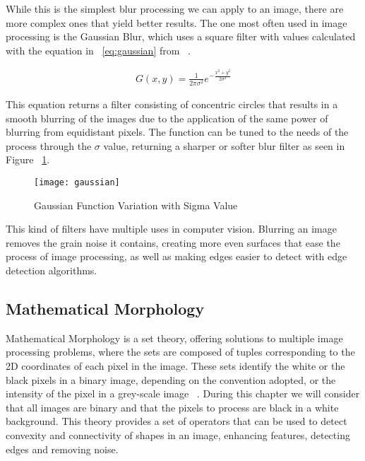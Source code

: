 While this is the simplest blur processing we can apply to an image, there are more complex ones that yield better results. The one most often used in image processing is the Gaussian Blur, which uses a square filter with values calculated with the equation in ~\ref{eq:gaussian} from ~\cite{shapiro_computer_2001}.

\begin{eqnarray}
\label{eq:gaussian}
G(x,y) = \frac{1}{2\pi \sigma ^{2}}e^{-\frac{x^{2}+y^{2}}{2\sigma ^{2}}}
\end{eqnarray}

This equation returns a filter consisting of concentric circles that results in a smooth blurring of the images due to the application of the same power of blurring from equidistant pixels. The function can be tuned to the needs of the process through the $\sigma$ value, returning a sharper or softer blur filter as seen in Figure ~\ref{fig:gaussian}.

\begin{figure}[h]
  \begin{center}
    \leavevmode
    \texttt{[image: gaussian]}
    \caption{Gaussian Function Variation with Sigma Value}
    \label{fig:gaussian}
  \end{center}
\end{figure}

This kind of filters have multiple uses in computer vision. Blurring an image removes the grain noise it contains, creating more even surfaces that ease the process of image processing, as well as making edges easier to detect with edge detection algorithms.

\subsection{Mathematical Morphology}

Mathematical Morphology is a set theory, offering solutions to multiple image processing problems, where the sets are composed of tuples corresponding to the 2D coordinates of each pixel in the image. These sets identify the white or the black pixels in a binary image, depending on the convention adopted, or the intensity of the pixel in a grey-scale image ~\cite{dougherty_introduction_1992}. During this chapter we will consider that all images are binary and that the pixels to process are black in a white background. This theory provides a set of operators that can be used to detect convexity and connectivity of shapes in an image, enhancing features, detecting edges and removing noise. 

